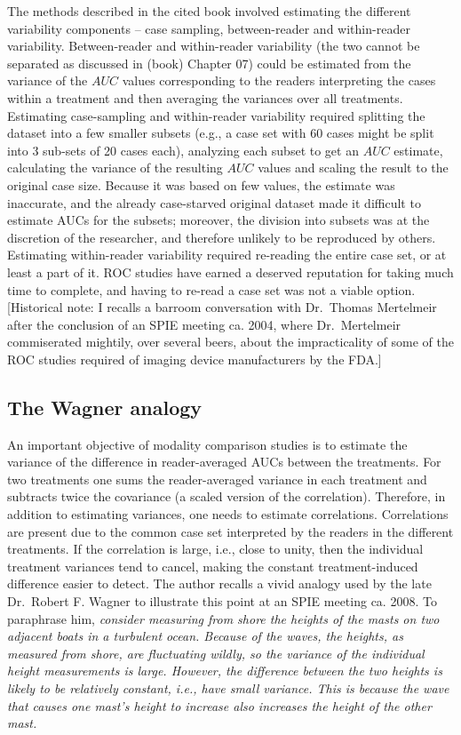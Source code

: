 \documentclass[
]{book}
\begin{document}
The methods \citep{RN412} described in the cited book involved estimating the different variability components -- case sampling, between-reader and within-reader variability. Between-reader and within-reader variability (the two cannot be separated as discussed in (book) Chapter 07) could be estimated from the variance of the \(AUC\) values corresponding to the readers interpreting the cases within a treatment and then averaging the variances over all treatments. Estimating case-sampling and within-reader variability required splitting the dataset into a few smaller subsets (e.g., a case set with 60 cases might be split into 3 sub-sets of 20 cases each), analyzing each subset to get an \(AUC\) estimate, calculating the variance of the resulting \(AUC\) values \citep{RN412} and scaling the result to the original case size. Because it was based on few values, the estimate was inaccurate, and the already case-starved original dataset made it difficult to estimate AUCs for the subsets; moreover, the division into subsets was at the discretion of the researcher, and therefore unlikely to be reproduced by others. Estimating within-reader variability required re-reading the entire case set, or at least a part of it. ROC studies have earned a deserved reputation for taking much time to complete, and having to re-read a case set was not a viable option. {[}Historical note: I recalls a barroom conversation with Dr.~Thomas Mertelmeir after the conclusion of an SPIE meeting ca. 2004, where Dr.~Mertelmeir commiserated mightily, over several beers, about the impracticality of some of the ROC studies required of imaging device manufacturers by the FDA.{]}

\hypertarget{the-wagner-analogy}{%
\subsection{The Wagner analogy}\label{the-wagner-analogy}}

An important objective of modality comparison studies is to estimate the variance of the difference in reader-averaged AUCs between the treatments. For two treatments one sums the reader-averaged variance in each treatment and subtracts twice the covariance (a scaled version of the correlation). Therefore, in addition to estimating variances, one needs to estimate correlations. Correlations are present due to the common case set interpreted by the readers in the different treatments. If the correlation is large, i.e., close to unity, then the individual treatment variances tend to cancel, making the constant treatment-induced difference easier to detect. The author recalls a vivid analogy used by the late Dr.~Robert F. Wagner to illustrate this point at an SPIE meeting ca. 2008. To paraphrase him, \emph{consider measuring from shore the heights of the masts on two adjacent boats in a turbulent ocean. Because of the waves, the heights, as measured from shore, are fluctuating wildly, so the variance of the individual height measurements is large. However, the difference between the two heights is likely to be relatively constant, i.e., have small variance. This is because the wave that causes one mast's height to increase also increases the height of the other mast.}
\end{document}
